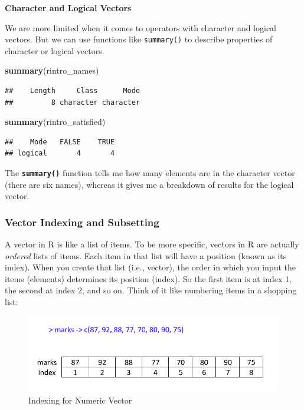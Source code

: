 \documentclass[
]{book}
\newenvironment{Shaded}{\begin{snugshade}}{\end{snugshade}}
\newcommand{\FunctionTok}[1]{\textcolor[rgb]{0.13,0.29,0.53}{\textbf{#1}}}
\newcommand{\NormalTok}[1]{#1}
\begin{document}
\textbf{Character and Logical Vectors}

We are more limited when it comes to operators with character and logical vectors. But we can use functions like \texttt{summary()} to describe properties of character or logical vectors.

\begin{Shaded}
\begin{Highlighting}[]
\FunctionTok{summary}\NormalTok{(rintro\_names)}
\end{Highlighting}
\end{Shaded}

\begin{verbatim}
##    Length     Class      Mode 
##         8 character character
\end{verbatim}

\begin{Shaded}
\begin{Highlighting}[]
\FunctionTok{summary}\NormalTok{(rintro\_satisfied)}
\end{Highlighting}
\end{Shaded}

\begin{verbatim}
##    Mode   FALSE    TRUE 
## logical       4       4
\end{verbatim}

The \textbf{\texttt{summary()}} function tells me how many elements are in the character vector (there are six names), whereas it gives me a breakdown of results for the logical vector.

\hypertarget{vector-indexing-and-subsetting}{%
\subsubsection{Vector Indexing and Subsetting}\label{vector-indexing-and-subsetting}}

A vector in R is like a list of items. To be more specific, vectors in R are actually \emph{ordered} lists of items. Each item in that list will have a position (known as its index). When you create that list (i.e., vector), the order in which you input the items (elements) determines its position (index). So the first item is at index 1, the second at index 2, and so on. Think of it like numbering items in a shopping list:

\begin{figure}
\centering
\includegraphics{img/03-index_numeric.png}
\caption{\label{fig:unnamed-chunk-67}Indexing for Numeric Vector}
\end{figure}
\end{document}
